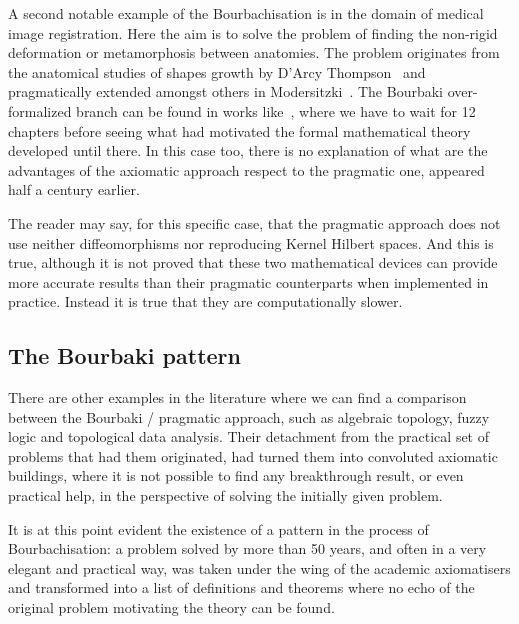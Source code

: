 \documentclass[]{scrartcl}
\theoremstyle{definition}
\begin{document}
A second notable example of the Bourbachisation is in the domain of medical image registration. Here the aim is to solve the problem of finding the non-rigid deformation or metamorphosis between anatomies. The problem originates from the anatomical studies of shapes growth by D'Arcy Thompson~\cite{d1942growth} and pragmatically extended amongst others in Modersitzki~\cite{modersitzki2004numerical}. The Bourbaki over-formalized branch can be found in works like~\cite{younes2010shapes}, where we have to wait for 12 chapters before seeing what had motivated the formal mathematical theory developed until there.
In this case too, there is no explanation of what are the advantages of the axiomatic approach respect to the pragmatic one, appeared half a century earlier.

The reader may say, for this specific case, that the pragmatic approach \cite{modersitzki2004numerical} does not use neither diffeomorphisms nor reproducing Kernel Hilbert spaces. And this is true, although it is not proved that these two mathematical devices can provide more accurate results than their pragmatic counterparts when implemented in practice. Instead it is true that they are computationally slower.


\subsection*{The Bourbaki pattern}

There are other examples in the literature where we can find a comparison between the Bourbaki / pragmatic approach, such as algebraic topology, fuzzy logic and topological data analysis. Their detachment from the practical set of problems that had them originated, had turned them into convoluted axiomatic buildings, where it is not possible to find any breakthrough result, or even practical help, in the perspective of solving the initially given problem.

It is at this point evident the existence of a pattern in the process of Bourbachisation: a problem solved by more than 50 years, and often in a very elegant and practical way, was taken under the wing of the academic axiomatisers and transformed into a list of definitions and theorems where no echo of the original problem motivating the theory can be found.

\end{document}
